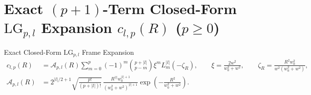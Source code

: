 \documentclass[10pt,letterpaper]{article}
\newcommand{\abs}[1]{\lvert #1 \rvert}
\numberwithin{equation}{section}
\begin{document}
\section{Exact $(p+1)$-Term Closed-Form $\mathrm{LG}_{p,l}$ Expansion $c_{l,p}(R)$ ($p \ge 0$)}
\label{sec:p1_clp}

\begin{targeteq}{Exact Closed-Form $\mathrm{LG}_{p,l}$ Frame Expansion}
\begin{align*}
  c_{l,p}(R) &= \mathcal{A}_{p,l}(R) \sum_{m=0}^p (-1)^m \binom{p+\abs{l}}{p-m} \xi^m L_m^{\abs{l}}(-\zeta_R), \qquad
  \xi = \frac{2w^2}{w_0^2+w^2}, \qquad \zeta_R = \frac{R^2 w_0^2}{w^2(w_0^2+w^2)}, \\
  \mathcal{A}_{p,l}(R) &= 2^{\abs{l}/2 + 1}\sqrt{\frac{p!}{(p+\abs{l})!}}\,\frac{R^{\abs{l}} w_0^{\abs{l}+1}}{(w_0^2+w^2)^{\abs{l}+1}}\exp\!\left(-\frac{R^2}{w_0^2+w^2}\right).
\end{align*}
\end{targeteq}
\end{document}
